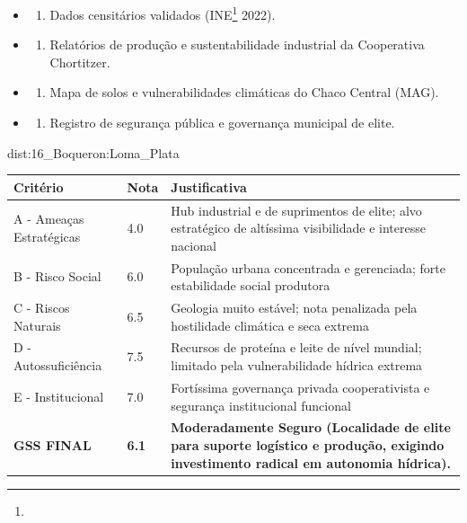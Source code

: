 {\begin{itemize}
\tightlist
\item
  \begin{enumerate}
  \def\labelenumi{\arabic{enumi})}
  \tightlist
  \item
    Dados censitários validados (INE\footnote{\fineINE} 2022).
  \end{enumerate}
\item
  \begin{enumerate}
  \def\labelenumi{\arabic{enumi})}
  \setcounter{enumi}{1}
  \tightlist
  \item
    Relatórios de produção e sustentabilidade industrial da Cooperativa
    Chortitzer.
  \end{enumerate}
\item
  \begin{enumerate}
  \def\labelenumi{\arabic{enumi})}
  \setcounter{enumi}{2}
  \tightlist
  \item
    Mapa de solos e vulnerabilidades climáticas do Chaco Central (MAG).
  \end{enumerate}
\item
  \begin{enumerate}
  \def\labelenumi{\arabic{enumi})}
  \setcounter{enumi}{3}
  \tightlist
  \item
    Registro de segurança pública e governança municipal de elite.
  \end{enumerate}
\end{itemize}}{dist:16_Boqueron:Loma_Plata}
\begin{table}[ht!]
\small \begin{tabular}{p{3.0cm}p{0.8cm}p{6.0cm}} \toprule
\textbf{Critério} & \textbf{Nota} & \textbf{Justificativa} \\ \midrule
A - Ameaças Estratégicas & 4.0 & Hub industrial e de suprimentos de elite; alvo estratégico de altíssima visibilidade e interesse nacional \\
B - Risco Social & 6.0 & População urbana concentrada e gerenciada; forte estabilidade social produtora \\
C - Riscos Naturais & 6.5 & Geologia muito estável; nota penalizada pela hostilidade climática e seca extrema \\
D - Autossuficiência & 7.5 & Recursos de proteína e leite de nível mundial; limitado pela vulnerabilidade hídrica extrema \\
E - Institucional & 7.0 & Fortíssima governança privada cooperativista e segurança institucional funcional \\
\midrule \textbf{GSS FINAL} & \textbf{6.1} & \textbf{Moderadamente Seguro (Localidade de elite para suporte logístico e produção, exigindo investimento radical em autonomia hídrica).} \\ \bottomrule \end{tabular}
\end{table}
